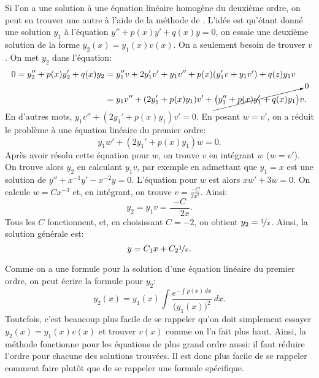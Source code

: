 \medskip

Si l'on a une solution à une équation linéaire homogène du deuxième ordre, on peut en trouver une autre à l'aide de la méthode de  \emph{}.  
L'idée est qu'étant donné une solution $y_1$ à l'équation
$y'' + p(x) y' + q(x) y = 0$, on essaie une deuxième solution de la forme $y_2(x) = y_1(x) v(x)$.
On a seulement besoin de trouver $v$.  On met $y_2$ dans l'équation:
\begin{align*}
	0 =  y_2'' + p(x) y_2' + q(x) y_2 
	& =  y_1'' v + 2 y_1' v' + y_1 v''
			+ p(x) ( y_1' v + y_1 v' )
			+ q(z) y_1 v \\
	& = y_1 v'' + (2 y_1' + p(x) y_1) v'
		+ \cancelto{0}{\bigl( y_1'' + p(x) y_1' + q(x) y_1 \bigr)} v .
\end{align*}
En d'autres mots,  $y_1 v'' + (2 y_1' + p(x) y_1) v' = 0$.  
En posant $w = v'$, on a réduit le problème à une équation linéaire du premier ordre:
\begin{equation*}
	y_1 w' + (2 y_1' + p(x) y_1) w = 0.
\end{equation*}
%
Après avoir résolu cette équation pour $w$,
on trouve $v$ en intégrant $w$ ($w=v'$).  On trouve alors $y_2$ en calculant
$y_1 v$, par exemple en admettant que $y_1 = x$ est une solution
de $y''+x^{-1}y'-x^{-2} y=0$.
L'équation pour $w$ est alors
$xw' + 3 w = 0$.  On calcule $w = Cx^{-3}$ et, en intégrant, on trouve  $v = \frac{-C}{2x^2}$.
Ainsi:
\begin{equation*}
	y_2 = y_1 v = \frac{-C}{\phantom-2x}.
\end{equation*}
%
Tous les $C$ fonctionnent, et, en choisissant $C=-2$, 
on obtient $y_2 = \nicefrac{1}{x}$.  Ainsi, la solution générale est:
\begin{equation*}
	y = C_1 x + C_2\nicefrac{1}{x}.
\end{equation*}

Comme on a une formule pour la solution d'une équation linéaire du premier ordre, 
on peut écrire la formule pour $y_2$:
\begin{equation*}
	y_2(x) = y_1(x) \int \frac{e^{-\int p(x)\,dx}}{{\bigl(y_1(x)\bigr)}^2} \,dx.
\end{equation*}
Toutefois, c'est beaucoup plus facile de se rappeler qu'on doit simplement essayer $y_2(x) =
y_1(x) v(x)$ et trouver $v(x)$ comme on l'a fait plus haut.  
Ainsi, la méthode fonctionne pour les équations de plus grand ordre aussi: 
il faut réduire l'ordre pour chacune des solutions trouvées. 
Il est donc plus facile de se rappeler comment faire plutôt que de se rappeler une formule spécifique. 



